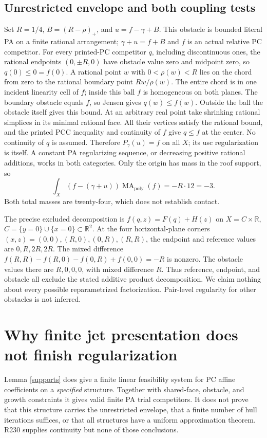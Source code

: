 \documentclass[11pt]{article}
\newcommand{\R}{\mathbb R}
\newcommand{\MA}{\operatorname{MA}_{\mathrm{poly}}}
\begin{document}
\subsection{Unrestricted envelope and both coupling tests}
Set $R=1/4$, $B=(R-\rho)_+$, and $u=f-\gamma+B$.
This obstacle is bounded literal PA on a finite rational arrangement;
$\gamma+u=f+B$ and $f$ is an actual relative PC competitor.
For every printed-PC competitor $q$, including discontinuous ones,
the rational endpoints $(0,\pm R,0)$ have obstacle value zero and
midpoint zero, so $q(0)\leq0=f(0)$. A rational point $w$ with
$0<\rho(w)<R$ lies on the chord from zero to the rational boundary
point $Rw/\rho(w)$. The entire chord is in one incident linearity
cell of $f$; inside this ball $f$ is homogeneous on both planes.
The boundary obstacle equals $f$, so Jensen gives $q(w)\leq f(w)$.
Outside the ball the obstacle itself gives this bound. At an arbitrary
real point take shrinking rational simplices in its minimal rational
face. All their vertices satisfy the rational bound, and the printed
PCC inequality and continuity of $f$ give $q\leq f$ at the center.
No continuity of $q$ is assumed. Therefore $P_\gamma(u)=f$ on all $X$;
its usc regularization is itself. A constant PA regularizing sequence,
or decreasing positive rational additions, works in both categories.
Only the origin has mass in the roof support, so
\begin{equation}\label{new-contact}
 \int_X(f-(\gamma+u))\MA(f)=-R\cdot12=-3.
\end{equation}
Both total masses are twenty-four, which does not establish contact.

The precise excluded decomposition is $f(q,z)=F(q)+H(z)$ on
$X=C\times\R$, $C=\{y=0\}\cup\{x=0\}\subset\R^2$.
At the four horizontal-plane corners $(x,z)=(0,0),(R,0),(0,R),(R,R)$,
the endpoint and reference values are $0,R,2R,2R$.
The mixed difference $f(R,R)-f(R,0)-f(0,R)+f(0,0)=-R$ is nonzero.
The obstacle values there are $R,0,0,0$, with mixed difference $R$.
Thus reference, endpoint, and obstacle all exclude the stated additive
product decomposition. We claim nothing about every possible reparametrized
factorization. Pair-level regularity for other obstacles is not inferred.

\section{Why finite jet presentation does not finish regularization}
Lemma \ref{supports} does give a finite linear feasibility system for
PC affine coefficients on a \emph{specified} structure. Together with
shared-face, obstacle, and growth constraints it gives valid finite
PA trial competitors. It does not prove that this structure carries
the unrestricted envelope, that a finite number of hull iterations
suffices, or that all structures have a uniform approximation theorem.
R230 supplies continuity but none of those conclusions.
\end{document}
